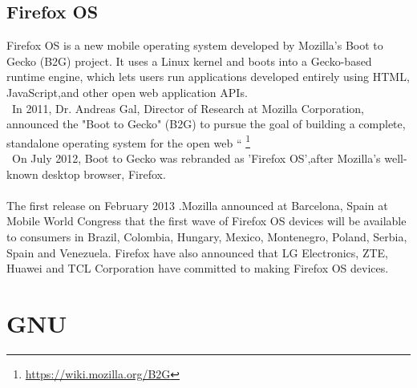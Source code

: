 \documentclass[a4paper,oneside,11pt]{article}
\begin{document}
\subsection{ Firefox OS} %
Firefox OS is a new mobile operating system developed by Mozilla's Boot to Gecko (B2G) project. It uses a Linux kernel and boots into a Gecko-based runtime engine, which lets users run applications developed entirely using HTML, JavaScript,and other open web application APIs.
\\\
In 2011, Dr. Andreas Gal, Director of Research at Mozilla Corporation, announced the "Boot to Gecko"  (B2G) to pursue the goal of building a complete, standalone operating system for the open web “  \footnote{\url{https://wiki.mozilla.org/B2G}}
\\\
On July 2012, Boot to Gecko was rebranded as 'Firefox OS',after Mozilla's well-known desktop browser, Firefox.
\\\\
The first release  on February 2013 .Mozilla announced at Barcelona, Spain at  Mobile World Congress that the first wave of Firefox OS devices will be available to consumers in Brazil, Colombia, Hungary, Mexico, Montenegro, Poland, Serbia, Spain and Venezuela. Firefox have also announced that LG Electronics, ZTE, Huawei and TCL Corporation have committed to making Firefox OS devices. 

\section{GNU}
\end{document}
